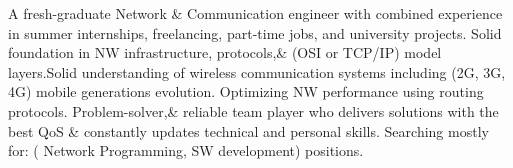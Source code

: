 

\begin{cvparagraph}

{\scriptsize  A fresh-graduate Network \& Communication engineer with combined experience in summer internships, freelancing, part-time jobs, and university projects. Solid foundation in NW infrastructure, protocols,\& (OSI or TCP/IP) model layers.Solid understanding of wireless communication systems including (2G, 3G, 4G) mobile generations evolution. Optimizing NW performance using routing protocols. Problem-solver,\& reliable team player who delivers solutions with the best QoS \&  constantly updates technical and personal skills. Searching mostly for: ( Network Programming, SW development) positions.} 
\end{cvparagraph}